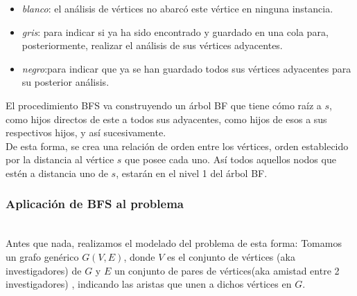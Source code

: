 \begin{itemize}
\item \textit{blanco}: el análisis de vértices no abarcó este vértice en ninguna
instancia.
\item \textit{gris}: para indicar si ya ha sido encontrado y guardado en una
cola para, posteriormente, realizar el análisis de sus vértices adyacentes.
\item \textit{negro}:para indicar que ya se han guardado todos sus vértices
adyacentes para su posterior análisis.
\end{itemize}

El procedimiento BFS va construyendo un árbol BF que tiene cómo raíz a
$s$, como hijos directos de este a todos sus adyacentes, como hijos de esos a
sus respectivos hijos, y así sucesivamente.\\
\indent De esta forma, se crea una relación de orden entre los vértices, orden
establecido por la distancia al vértice $s$ que posee cada uno. Así todos
aquellos nodos que estén a distancia uno de $s$, estarán en el nivel 1 del árbol
BF.\\

\subsubsection{Aplicación de BFS al problema}
\indent {}\\

\indent Antes que nada, realizamos el modelado del problema de esta forma:
Tomamos un grafo genérico $G(V,E)$, donde $V$ es el conjunto de vértices (aka
investigadores) de $G$ y $E$ un conjunto de pares de vértices(aka amistad entre
2 investigadores) , indicando las aristas que unen a dichos vértices en $G$.\\

